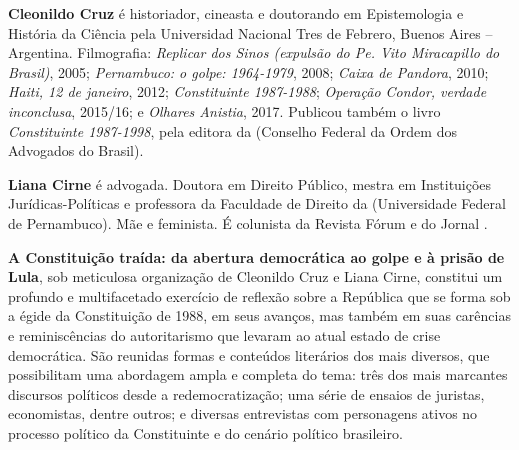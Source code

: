 \textbf{Cleonildo Cruz} é historiador, cineasta e doutorando em Epistemologia e História da Ciência pela Universidad Nacional Tres de Febrero, Buenos Aires – Argentina. Filmografia: \emph{Replicar dos Sinos (expulsão do Pe. Vito Miracapillo do Brasil)}, 2005; \emph{Pernambuco: o golpe: 1964-1979}, 2008; \emph{Caixa de Pandora}, 2010; \emph{Haiti, 12 de janeiro}, 2012; \emph{Constituinte 1987-1988}; \emph{Operação Condor, verdade inconclusa}, 2015/16; e \emph{Olhares Anistia}, 2017. Publicou também o livro \emph{Constituinte 1987-1998}, pela editora da  (Conselho Federal da Ordem dos Advogados do Brasil).

\textbf{Liana Cirne} é advogada. Doutora em Direito Público, mestra em Instituições Jurídicas-Políticas e professora da Faculdade de Direito da  (Universidade Federal de Pernambuco). Mãe e feminista. É colunista da Revista Fórum e do Jornal .

\textbf{A Constituição traída: da abertura democrática ao golpe e à prisão de Lula}, sob meticulosa organização de Cleonildo Cruz e Liana Cirne, constitui um profundo e multifacetado exercício de reflexão sobre a República que se forma sob a égide da Constituição de 1988, em seus avanços, mas também em suas carências e reminiscências do autoritarismo que levaram ao atual estado de crise democrática. São reunidas formas e conteúdos literários dos mais diversos, que possibilitam uma abordagem ampla e completa do tema: três dos mais marcantes discursos políticos desde a redemocratização; uma série de ensaios de juristas, economistas, dentre outros; e diversas entrevistas com personagens ativos no processo político da Constituinte e do cenário político brasileiro.

